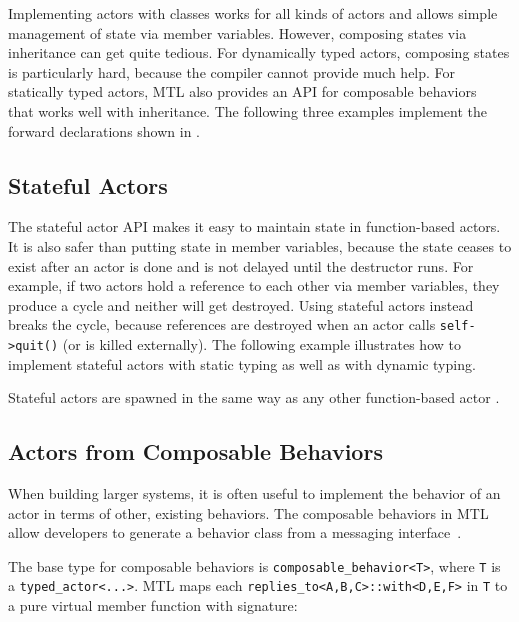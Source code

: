Implementing actors with classes works for all kinds of actors and allows
simple management of state via member variables. However, composing states via
inheritance can get quite tedious. For dynamically typed actors, composing
states is particularly hard, because the compiler cannot provide much help. For
statically typed actors, MTL also provides an API for composable
behaviors~ that works well with inheritance. The
following three examples implement the forward declarations shown in
.


\clearpage
\subsection{Stateful Actors}
\label{stateful-actor}

The stateful actor API makes it easy to maintain state in function-based
actors. It is also safer than putting state in member variables, because the
state ceases to exist after an actor is done and is not delayed until the
destructor runs. For example, if two actors hold a reference to each other via
member variables, they produce a cycle and neither will get destroyed. Using
stateful actors instead breaks the cycle, because references are destroyed when
an actor calls \lstinline^self->quit()^ (or is killed externally). The
following example illustrates how to implement stateful actors with static
typing as well as with dynamic typing.


Stateful actors are spawned in the same way as any other function-based actor
.


\clearpage
\subsection{Actors from Composable Behaviors \experimental}
\label{composable-behavior}

When building larger systems, it is often useful to implement the behavior of
an actor in terms of other, existing behaviors. The composable behaviors in
MTL allow developers to generate a behavior class from a messaging
interface~.

The base type for composable behaviors is \lstinline^composable_behavior<T>^,
where \lstinline^T^ is a \lstinline^typed_actor<...>^. MTL maps each
\lstinline^replies_to<A,B,C>::with<D,E,F>^ in \lstinline^T^ to a pure virtual
member function with signature:


